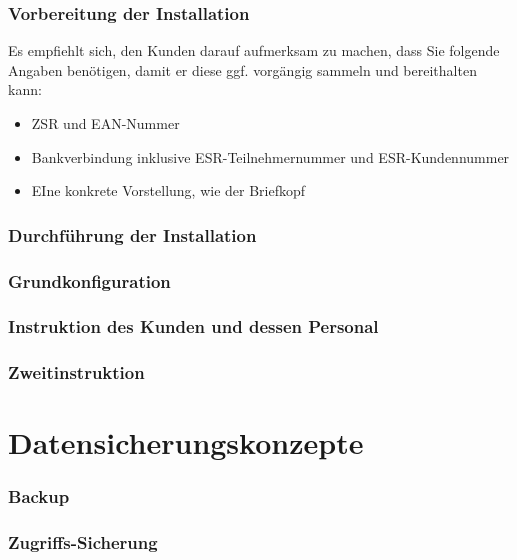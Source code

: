 \documentclass[paper=a4,BCOR8.25mm,twoside]{scrartcl}
\begin{document}
\section{Vorbereitung der Installation}
\label{besprechung}
Es empfiehlt sich, den Kunden darauf aufmerksam zu machen, dass Sie folgende Angaben benötigen, damit er diese ggf. vorgängig sammeln und bereithalten kann:
\begin{itemize}
    \item ZSR und EAN-Nummer
    \item Bankverbindung inklusive ESR-Teilnehmernummer und ESR-Kundennummer
    \item EIne konkrete Vorstellung, wie der Briefkopf 

\end{itemize}

\section{Durchführung der Installation}
\label{ablauf}

\section{Grundkonfiguration}
\label{config}
\section{Instruktion des Kunden und dessen Personal}

\section{Zweitinstruktion}

\part{Datensicherungskonzepte}
\section{Backup}
\label{backup}

\section{Zugriffs-Sicherung}
\label{security}
\end{document}
